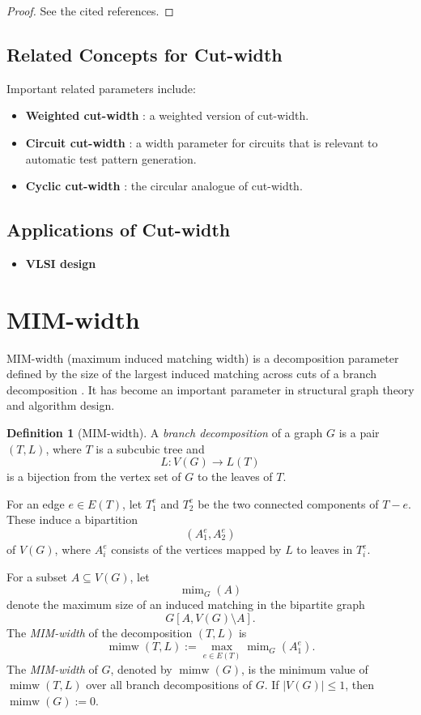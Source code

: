 \documentclass[10pt]{book}
\theoremstyle{definition}
\newtheorem{definition}[theorem]{Definition}
\begin{document}
\begin{proof}
See the cited references.
\end{proof}

\subsection{Related Concepts for Cut-width}

Important related parameters include:

\begin{itemize}
    \item \textbf{Weighted cut-width} \cite{179,180}: a weighted version of cut-width.
    \item \textbf{Circuit cut-width} \cite{prasad1999atpg,chong1998satisfiability}: a width parameter for circuits that is relevant to automatic test pattern generation.
    \item \textbf{Cyclic cut-width} \cite{raspaud2000congestion}: the circular analogue of cut-width.
\end{itemize}

\subsection{Applications of Cut-width}

\begin{itemize}
    \item \textbf{VLSI design} \cite{Berend2008MinimalCL}
\end{itemize}

\section{MIM-width}

MIM-width (maximum induced matching width) is a decomposition parameter defined by the size of the largest induced matching across cuts of a branch decomposition \cite{31,32}.  
It has become an important parameter in structural graph theory and algorithm design.

\begin{definition}[MIM-width]
\cite{31,32}
A \emph{branch decomposition} of a graph \(G\) is a pair \((T,L)\), where \(T\) is a subcubic tree and
\[
L:V(G)\to L(T)
\]
is a bijection from the vertex set of \(G\) to the leaves of \(T\).

For an edge \(e\in E(T)\), let \(T_1^e\) and \(T_2^e\) be the two connected components of \(T-e\).  
These induce a bipartition
\[
(A_1^e,A_2^e)
\]
of \(V(G)\), where \(A_i^e\) consists of the vertices mapped by \(L\) to leaves in \(T_i^e\).

For a subset \(A\subseteq V(G)\), let
\[
\operatorname{mim}_G(A)
\]
denote the maximum size of an induced matching in the bipartite graph
\[
G[A,V(G)\setminus A].
\]
The \emph{MIM-width} of the decomposition \((T,L)\) is
\[
\operatorname{mimw}(T,L):=\max_{e\in E(T)} \operatorname{mim}_G(A_1^e).
\]
The \emph{MIM-width} of \(G\), denoted by \(\operatorname{mimw}(G)\), is the minimum value of \(\operatorname{mimw}(T,L)\) over all branch decompositions of \(G\).  
If \(|V(G)|\leq 1\), then \(\operatorname{mimw}(G):=0\).
\end{definition}
\end{document}
